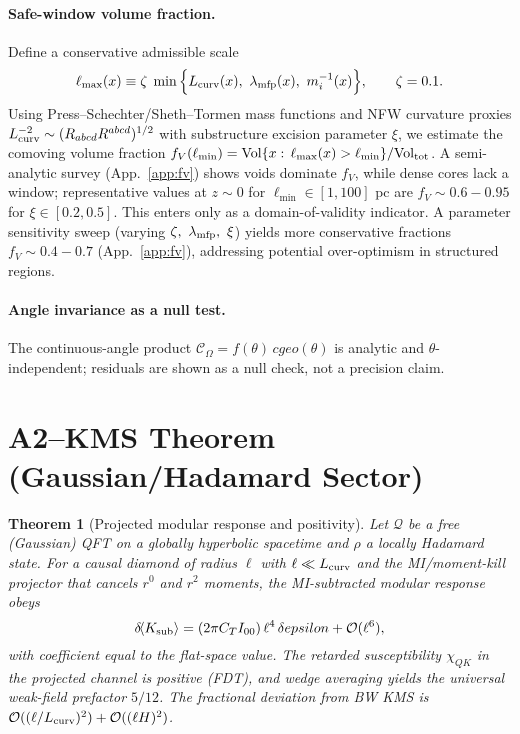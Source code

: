 \documentclass[aps,prd,onecolumn,superscriptaddress,nofootinbib]{revtex4-2}
\def\cgeo{cgeo}%
\def\eps{epsilon}%
\def\Omega_\Lambda{OmegaLambda}%
\providecommand{\cgeo}{c_{\rm geo}}
\providecommand{\eps}{\varepsilon}
\providecommand{\be}{\begin{equation}}
\providecommand{\ee}{\end{equation}}
\newtheorem{theorem}{Theorem}
\begin{document}
\paragraph{Safe-window volume fraction.} Define a conservative admissible scale
\be
\ell_{\max}(x)\equiv \zeta\;\min\Big\{L_{\rm curv}(x),\ \lambda_{\rm mfp}(x),\ m_i^{-1}(x)\Big\},\qquad \zeta=0.1.
\ee
Using Press--Schechter/Sheth--Tormen mass functions and NFW curvature proxies \(L_{\rm curv}^{-2}\sim (R_{abcd}R^{abcd})^{1/2}\) with substructure excision parameter \(\xi\), we estimate the comoving volume fraction \(f_V(\ell_{\min})=\mathrm{Vol}\{x:\,\ell_{\max}(x)>\ell_{\min}\}/\mathrm{Vol}_{\rm tot}\). A semi-analytic survey (App.~\ref{app:fv}) shows voids dominate \(f_V\), while dense cores lack a window; representative values at \(z\!\sim\!0\) for \(\ell_{\min}\in[1,100]\) pc are \(f_V\sim 0.6{-}0.95\) for \(\xi\in[0.2,0.5]\). This enters only as a domain-of-validity indicator. A parameter sensitivity sweep (varying \(\zeta,\ \lambda_{\rm mfp},\ \xi\)) yields more conservative fractions \(f_V\sim 0.4{-}0.7\) (App.~\ref{app:fv}), addressing potential over-optimism in structured regions.

\paragraph{Angle invariance as a null test.} The continuous-angle product \(\mathcal C_\Omega=f(\theta)\,\cgeo(\theta)\) is analytic and \(\theta\)-independent; residuals are shown as a null check, not a precision claim.

\section{A2–KMS Theorem (Gaussian/Hadamard Sector)}
\label{sec:theorem}

\begin{theorem}[Projected modular response and positivity]
Let \(\mathcal Q\) be a free (Gaussian) QFT on a globally hyperbolic spacetime and \(\rho\) a locally Hadamard state. For a causal diamond of radius \(\ell\) with \(\ell\ll L_{\rm curv}\) and the MI/moment-kill projector that cancels \(r^0\) and \(r^2\) moments, the MI-subtracted modular response obeys
\be
\delta\!\langle K_{\rm sub}\rangle=(2\pi C_T I_{00})\,\ell^4\,\delta\eps+\mathcal O(\ell^6),
\ee
with coefficient equal to the flat-space value. The retarded susceptibility \(\chi_{QK}\) in the projected channel is positive (FDT), and wedge averaging yields the universal weak-field prefactor \(5/12\). The fractional deviation from BW KMS is \(\mathcal O((\ell/L_{\rm curv})^2)+\mathcal O((\ell H)^2)\).
\end{theorem}
\end{document}
